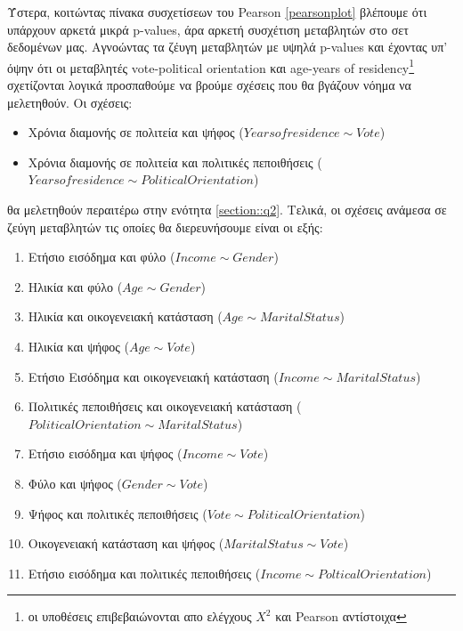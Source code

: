 \documentclass[10pt, letterpaper]{article}
\begin{document}
            \par Ύστερα, κοιτώντας πίνακα συσχετίσεων του Pearson \ref{pearsonplot} βλέπουμε ότι υπάρχουν αρκετά μικρά p-values, άρα αρκετή συσχέτιση μεταβλητών στο σετ δεδομένων μας. Αγνοώντας τα ζέυγη μεταβλητών με υψηλά p-values και έχοντας υπ' όψην ότι οι μεταβλητές vote-political orientation και age-years of residency\footnote{οι υποθέσεις επιβεβαιώνονται απο ελέγχους $X^2$ και Pearson αντίστοιχα} σχετίζονται λογικά προσπαθούμε να βρούμε σχέσεις που θα βγάζουν νόημα να μελετηθούν. Οι σχέσεις:
            \begin{itemize}
                \item Χρόνια διαμονής σε πολιτεία και ψήφος ($Yearsofresidence \sim Vote$)
                \item Χρόνια διαμονής σε πολιτεία και πολιτικές πεποιθήσεις ($Yearsofresidence \sim PoliticalOrientation$)
            \end{itemize}
             θα μελετηθούν περαιτέρω στην ενότητα \ref{section::q2}. Τελικά, οι σχέσεις ανάμεσα σε ζεύγη μεταβλητών τις οποίες θα διερευνήσουμε είναι οι εξής:
    
            \begin{enumerate}
                \item Ετήσιο εισόδημα και φύλο ($Income \sim Gender$)
                \item Ηλικία και φύλο ($Age \sim Gender$)
                \item Ηλικία και οικογενειακή κατάσταση ($Age \sim Marital Status$)
                \item Ηλικία και ψήφος ($Age \sim Vote$)
                \item Ετήσιο Εισόδημα και οικογενειακή κατάσταση ($Income \sim Marital Status$)
                \item Πολιτικές πεποιθήσεις και οικογενειακή κατάσταση ($Political Orientation \sim Marital Status$)
                \item Ετήσιο εισόδημα και ψήφος ($Income \sim Vote$)
                \item Φύλο και ψήφος ($Gender \sim Vote$)
                \item Ψήφος και πολιτικές πεποιθήσεις ($Vote \sim Political Orientation$)
                \item Οικογενειακή κατάσταση και ψήφος ($Marital Status \sim Vote$)
                \item Ετήσιο εισόδημα και πολιτικές πεποιθήσεις ($Income \sim Poltical Orientation$)
            \end{enumerate}
\end{document}
